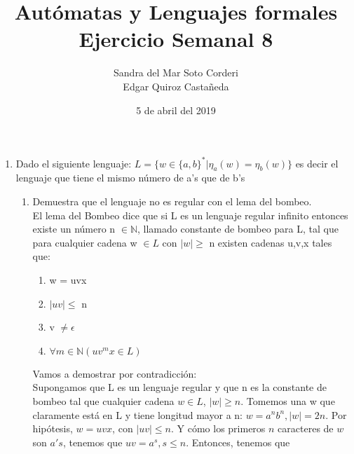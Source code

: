 \documentclass{article}
\begin{document}
    \title{
        Autómatas y Lenguajes formales \\
        Ejercicio Semanal 8
    }

    \author{
        Sandra del Mar Soto Corderi \\
        Edgar Quiroz Castañeda
    }

    \date{
        5 de abril del 2019
    }
    
    \maketitle

    \begin{enumerate}
        \item {
        Dado el siguiente lenguaje: $L = \{w \in \{a,b\}^* | \eta_a(w) = \eta_b(w) \}$ es decir el lenguaje que tiene el mismo número de a's que de b's
        \begin{enumerate}
        	\item {
        	Demuestra que el lenguaje no es regular con el lema del bombeo.\\
        	
        	El lema del Bombeo dice que si L es un lenguaje regular infinito entonces existe un número n $\in \mathbb{N}$, llamado constante de bombeo para L, tal que para cualquier cadena w $\in L$ con $|w| \geq$ n existen cadenas u,v,x tales que:        	
        	\begin{enumerate}
        		\item {
        		w = uvx
        		}
        		\item {
        		$|uv| \leq$ n
        		}
       		 	\item {
        		v $\neq \epsilon$
        		}
    			\item {
    			$\forall m \in \mathbb{N} (uv^mx \in L)$
    			}
        	\end{enumerate}
        	
        	Vamos a demostrar por contradicción:\\
        	
			Supongamos que L es un lenguaje regular y que n es la constante de 
			bombeo tal que cualquier cadena $w \in L$, $|w| \geq n$. 
			Tomemos una w que claramente está en L y tiene longitud mayor a n: 
			$w = a^nb^n, |w| = 2n$. Por hipótesis, $w = uvx$, con $|uv| \leq n$.
			Y cómo los primeros $n$ caracteres de $w$ son $a's$, tenemos que 
			$uv = a^{s}, s \leq n$. Entonces, tenemos que 
        	
}
\end{enumerate}}
\end{enumerate}
\end{document}
